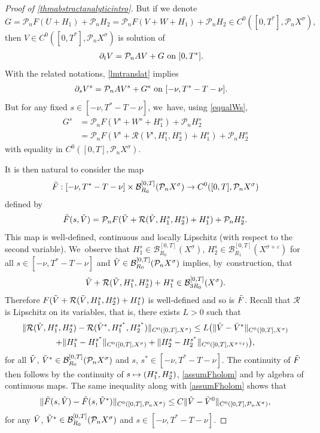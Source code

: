 \documentclass[JEP,XML,SOM,Unicode,published]{cedram}
\newcommand\mto{\mathchoice{\longmapsto}{\mapsto}{\mapsto}{\mapsto}}
\theoremstyle{definition}
\let\mc\mathcal
\let\veps\varepsilon
\newcommand{\B}{\mc{B}}
\renewcommand{\P}{\mathcal{P}}
\providecommand{\norm}[1]{\lVert#1\rVert}
\begin{document}
\begin{proof}[Proof of \cref{thmabstractanalyticintro}]
But if we denote
\[
G=\P_n F(U+H_{1})+\P_n H_{2}=\P_n F(V+W+H_{1})+\P_n H_{2}\in C^0([0,T^*],\P_n X^{\sigma}),
\]
then $V\in C^0([0,T^*],\P_n X^{\sigma})$ is solution of
\begin{align*}
\partial_t V=\P_n AV+G& \textnormal{ on } [0,T^{*}].
\end{align*}
With the related notations, \cref{lmtranslat} implies
\begin{align}
\label{eqVG}
\partial_s V^s=\P_n AV^s+G^s& \textnormal{ on } [-\nu, T^*-T-\nu].
\end{align}
But for any fixed $s\in [-\nu, T^*-T-\nu]$, we~have, using \eqref{equalWs},
\begin{align*}
G^s&=\P_n F(V^s+W^s+H_{1}^s)+\P_n H_{2}^s\\ &=\P_n F(V^s+\mathcal{R}(V^s,H_{1}^s,H_{2}^s)+H_{1}^s)+\P_n H_{2}^s
\end{align*}
with equality in $C^0([0,T], \P_n X^{\sigma})$.

It is then natural to consider the map
\begin{align*}
\Tilde{F}: [-\nu, T^*-T-\nu]\times \B_{R_{0}}^{[0,T]}(\P_n X^{\sigma})\to C^0([0, T], \P_n X^\sigma)
\end{align*}
defined by
\begin{align*}
\Tilde{F}(s,\Tilde{V})=\P_n F(\Tilde{V}+\mathcal{R}(\Tilde{V},H_{1}^s,H_{2}^s)+H_{1}^s)+\P_n H_{2}^s.
\end{align*}
This map is well-defined, continuous and locally Lipschitz (with respect to the second variable). We~observe that $H_1^s\in \B_{R_0}^{[0, T]}(X^\sigma)$, $H_2^s\in \B_{R_{1}}^{[0, T]}(X^{\sigma+\veps})$ for all \hbox{$s\in [-\nu, T^*-T-\nu]$} and $\Tilde{V}\in \B_{R_{0}}^{[0,T]}(\P_n X^{\sigma})$ implies, by~construction, that
\[
\Tilde{V}+\mathcal{R}(\Tilde{V},H_{1}^s,H_{2}^s)+H_{1}^s\in \B_{3R_0}^{[0, T]}(X^\sigma).
\]
Therefore $F(\Tilde{V}+\mathcal{R}(\Tilde{V},H_{1}^s,H_{2}^s)+H_{1}^s)$ is well-defined and so is $\Tilde{F}$. Recall that $\mc{R}$ is Lipschitz on its variables, that is, there exists $L>0$ such that
\begin{multline*}
\norm{\mc{R}(\Tilde{V}, H_{1}^{s}, H_2^{s})-\mc{R}(\Tilde{V}^*, H_{1}^{s^*}, H_2^{s^*})}_{C^0([0, T], X^\sigma)}\leq L\big( \norm{\Tilde{V}-\Tilde{V}^*}_{C^0([0, T], X^\sigma)}\\+\norm{H_1^{s}-H_1^{s^*}}_{C^0([0, T], X^\sigma)}+\norm{H_2^{s}-H_2^{s^*}}_{C^0([0, T], X^{\sigma+\veps})} \big),
\end{multline*}
for all $\Tilde{V}$, $\Tilde{V}^*\in \B_{R_{0}}^{[0,T]}(\P_n X^{\sigma})$ and $s$, $s^*\in [-\nu, T^*-T-\nu]$. The continuity of $\Tilde{F}$ then follows by the continuity of $s\mto (H_1^s, H_2^s)$, \cref{assumFholom} and by algebra of continuous maps. The same inequality along with \cref{assumFholom} shows that
\begin{align*}
\norm{\Tilde{F}(s, \Tilde{V})-\Tilde{F}(s, \Tilde{V}^*)}_{C^0([0, T], \P_n X^\sigma)}\leq C\norm{\Tilde{V}-\Tilde{V}^0}_{C^0([0, T], \P_n X^\sigma)},
\end{align*}
for any $\Tilde{V}$, $\Tilde{V}^*\in \B_{R_{0}}^{[0,T]}(\P_n X^{\sigma})$ and $s\in [-\nu, T^*-T-\nu]$.


\end{proof}
\end{document}
